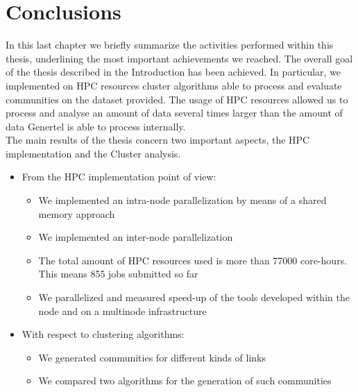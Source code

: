 \documentclass[a4paper,11pt]{book}
\begin{document}
\chapter{Conclusions}
In this last chapter we briefly summarize the activities performed within this thesis, underlining the most important achievements we reached. The overall goal of the thesis described in the Introduction has been achieved. In particular, we implemented on HPC resources cluster algorithms able to process and evaluate communities on the dataset provided. The usage of HPC resources allowed us to process and analyse an amount of data several times larger than the amount of data Genertel is able to process internally.\\

The main results of the thesis concern two important aspects, the HPC implementation and the Cluster analysis.
\begin{itemize}
\item From the HPC implementation point of view:
\begin{itemize}
\item We implemented an intra-node parallelization by means of a shared memory approach
\item We implemented an inter-node parallelization
\item The total amount of HPC resources used is more than 77000 core-hours. This means 855 jobs submitted so far
\item We parallelized and measured speed-up of the tools developed within the node and on a multinode infrastructure
\end{itemize}
\item With respect to clustering algorithms:
\begin{itemize}
\item We generated communities for different kinds of links 
\item We compared two algorithms for the generation of such communities
\end{itemize}
\end{itemize}
\end{document}
